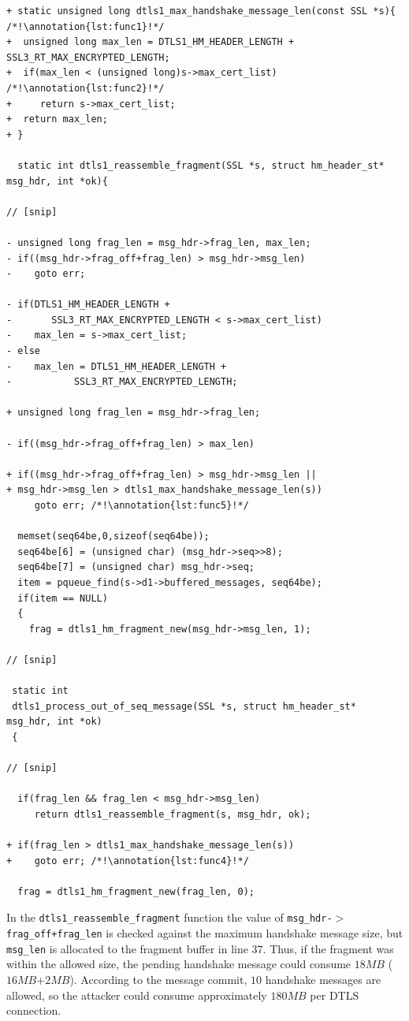 \documentclass[10pt,conference]{IEEEtran}
\newcounter{lstannotation}
\renewcommand{\thelstannotation}{\ding{\number\numexpr181+\arabic{lstannotation}}}
\newcommand{\annotation}[1]{\refstepcounter{lstannotation}\label{#1}\thelstannotation}
\begin{document}
\setcounter{lstannotation}{0}
\begin{lstlisting}[caption={Fix provided by OpenSSL developers to the
\\CVE-2014-3506 vulnerability},label={lst:vuln}]
+ static unsigned long dtls1_max_handshake_message_len(const SSL *s){ /*!\annotation{lst:func1}!*/
+  unsigned long max_len = DTLS1_HM_HEADER_LENGTH + SSL3_RT_MAX_ENCRYPTED_LENGTH;
+  if(max_len < (unsigned long)s->max_cert_list) /*!\annotation{lst:func2}!*/
+     return s->max_cert_list;
+  return max_len;
+ }

  static int dtls1_reassemble_fragment(SSL *s, struct hm_header_st* msg_hdr, int *ok){

// [snip]

- unsigned long frag_len = msg_hdr->frag_len, max_len; 
- if((msg_hdr->frag_off+frag_len) > msg_hdr->msg_len)
-    goto err;

- if(DTLS1_HM_HEADER_LENGTH +
-    	SSL3_RT_MAX_ENCRYPTED_LENGTH < s->max_cert_list)
-    max_len = s->max_cert_list;
- else
-    max_len = DTLS1_HM_HEADER_LENGTH +
-   		SSL3_RT_MAX_ENCRYPTED_LENGTH;

+ unsigned long frag_len = msg_hdr->frag_len;

- if((msg_hdr->frag_off+frag_len) > max_len)

+ if((msg_hdr->frag_off+frag_len) > msg_hdr->msg_len ||
+ msg_hdr->msg_len > dtls1_max_handshake_message_len(s))
     goto err; /*!\annotation{lst:func5}!*/

  memset(seq64be,0,sizeof(seq64be));
  seq64be[6] = (unsigned char) (msg_hdr->seq>>8);
  seq64be[7] = (unsigned char) msg_hdr->seq;
  item = pqueue_find(s->d1->buffered_messages, seq64be);
  if(item == NULL)
  {
    frag = dtls1_hm_fragment_new(msg_hdr->msg_len, 1);

// [snip]

 static int
 dtls1_process_out_of_seq_message(SSL *s, struct hm_header_st* msg_hdr, int *ok)
 {

// [snip]

  if(frag_len && frag_len < msg_hdr->msg_len)
     return dtls1_reassemble_fragment(s, msg_hdr, ok);

+ if(frag_len > dtls1_max_handshake_message_len(s))
+    goto err; /*!\annotation{lst:func4}!*/

  frag = dtls1_hm_fragment_new(frag_len, 0);

\end{lstlisting}

In the \texttt{dtls1\_reassemble\_fragment} function the value of
\texttt{msg\_hdr-$>$frag\_off+frag\_len} is checked against the maximum
handshake message size, but \texttt{msg\_len} is allocated to the fragment
buffer in line $37$. Thus, if the fragment was within the allowed size, the
pending handshake message could consume $18MB$ ($16MB$+$2MB$). According to the
message commit, $10$ handshake messages are allowed, so the attacker could
consume approximately $180MB$ per DTLS connection.
\end{document}

